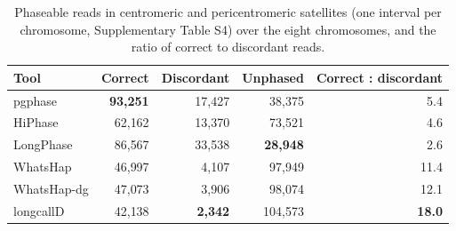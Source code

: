 \begin{table}[t]
\caption{Phaseable reads in centromeric and pericentromeric satellites (one interval per chromosome, Supplementary Table S4) over the eight chromosomes, and the ratio of correct to discordant reads.}\label{tab:cen}
\centering\footnotesize
\setlength{\tabcolsep}{4pt}
\begin{tabular}{@{}lrrrr@{}}
\toprule
Tool & Correct & Discordant & Unphased & Correct : discordant \\
\midrule
pgphase & \textbf{93{,}251} & 17{,}427 & 38{,}375 & 5.4 \\
HiPhase & 62{,}162 & 13{,}370 & 73{,}521 & 4.6 \\
LongPhase & 86{,}567 & 33{,}538 & \textbf{28{,}948} & 2.6 \\
WhatsHap & 46{,}997 & 4{,}107 & 97{,}949 & 11.4 \\
WhatsHap-dg & 47{,}073 & 3{,}906 & 98{,}074 & 12.1 \\
longcallD & 42{,}138 & \textbf{2{,}342} & 104{,}573 & \textbf{18.0} \\
\bottomrule
\end{tabular}
\end{table}
